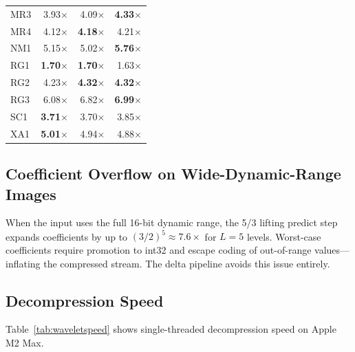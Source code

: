 \documentclass[10pt,twocolumn]{article}
\begin{document}
\begin{table}[h]
\begin{tabular}{lrrr}
    MR3   & 3.93$\times$ & 4.09$\times$ & \textbf{4.33$\times$} \\
    MR4   & 4.12$\times$ & \textbf{4.18$\times$} & 4.21$\times$ \\
    NM1   & 5.15$\times$ & 5.02$\times$ & \textbf{5.76$\times$} \\
    RG1   & \textbf{1.70$\times$} & \textbf{1.70$\times$} & 1.63$\times$ \\
    RG2   & 4.23$\times$ & \textbf{4.32$\times$} & \textbf{4.32$\times$} \\
    RG3   & 6.08$\times$ & 6.82$\times$ & \textbf{6.99$\times$} \\
    SC1   & \textbf{3.71$\times$} & 3.70$\times$ & 3.85$\times$ \\
    XA1   & \textbf{5.01$\times$} & 4.94$\times$ & 4.88$\times$ \\
    \bottomrule
  \end{tabular}
\end{table}

\subsection{Coefficient Overflow on Wide-Dynamic-Range Images}

When the input uses the full 16-bit dynamic range, the 5/3 lifting predict step expands coefficients by up to $(3/2)^5 \approx 7.6\times$ for $L=5$ levels. Worst-case coefficients require promotion to int32 and escape coding of out-of-range values---inflating the compressed stream. The delta pipeline avoids this issue entirely.

\subsection{Decompression Speed}

Table~\ref{tab:waveletspeed} shows single-threaded decompression speed on Apple M2 Max.
\end{document}
